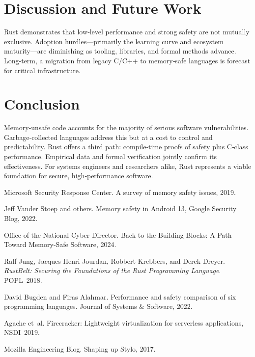 \documentclass[11pt]{article}
\begin{document}
\section{Discussion and Future Work}
Rust demonstrates that low‑level performance and strong safety
are not mutually exclusive.
Adoption hurdles—primarily the learning curve and ecosystem maturity—are
diminishing as tooling, libraries, and formal methods advance.
Long‑term, a migration from legacy C/C++ to memory‑safe languages is forecast
for critical infrastructure.

\section{Conclusion}
Memory‑unsafe code accounts for the majority of serious software
vulnerabilities.
Garbage‑collected languages address this but at a cost to control and
predictability.
Rust offers a third path: compile‑time proofs of safety plus C‑class
performance.
Empirical data and formal verification jointly confirm its
effectiveness.
For systems engineers and researchers alike, Rust represents a viable
foundation for secure, high‑performance software.

\newpage

\begin{thebibliography}{10}

Microsoft Security Response Center.
\newblock A survey of memory safety issues, 2019.

Jeff Vander Stoep and others.
\newblock Memory safety in {Android} 13, Google Security Blog, 2022. 

Office of the National Cyber Director.
\newblock Back to the Building Blocks: A Path Toward {Memory‑Safe} Software,
  2024.

Ralf Jung, Jacques-Henri Jourdan, Robbert Krebbers, and Derek Dreyer.
\newblock \emph{RustBelt: Securing the Foundations of the Rust Programming
  Language}.
\newblock POPL~2018.

David Bugden and Firas Alahmar.
\newblock Performance and safety comparison of six programming languages.
\newblock Journal of Systems \& Software, 2022.

Agache et~al.
\newblock Firecracker: Lightweight virtualization for serverless applications,
  NSDI~2019.

Mozilla Engineering Blog.
\newblock Shaping up {Stylo}, 2017.

\end{thebibliography}
\end{document}
